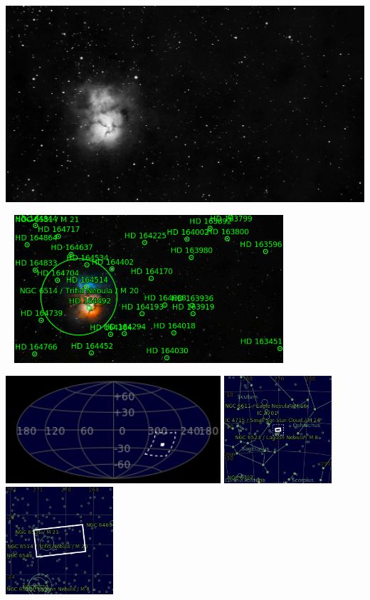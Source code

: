 {\footnotesize\color{white}


}\ \\
\includegraphics[width=\textwidth]{../Imaging//Grayscale/Trifid_Nebula.jpg}
\begin{center}
 \ \newpage
\includegraphics[width=0.75\textwidth]{../Imaging//Annotated/Trifid_Nebula_Annotated.jpg}

\includegraphics[height=4cm]{../Imaging//Annotated/Trifid_Nebula_Globe.jpg}
\includegraphics[height=4cm]{../Imaging//Annotated/Trifid_Nebula_Close.jpg}
\includegraphics[height=4cm]{../Imaging//Annotated/Trifid_Nebula_Closer.jpg}
\end{center}
